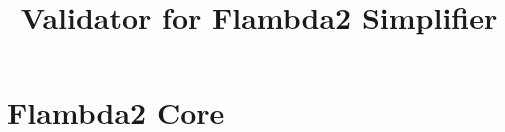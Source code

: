 \documentclass[11pt,fleqn]{amsart}
\begin{document}
\title{Validator for Flambda2 Simplifier}
\date{}
\maketitle{}


\section{Flambda2 Core}

\newcommand{\expr}{\mathit{exp}}
\newcommand{\var}{\mathit{var}}
\newcommand{\named}{\mathit{named}}
\newcommand{\arms}{\mathit{arms}}
\newcommand{\codeid}{\mathit{id}}
\newcommand{\code}{\mathit{code}}
\newcommand{\setofclo}{P}
\newcommand{\block}{\mathit{block}}
\newcommand{\blockpat}{\mathit{b}}
\newcommand{\simple}{\mathit{simple}}
\newcommand{\prim}{\mathit{prim}}
\newcommand{\staticconsts}{\chi}
\newcommand{\recinfo}{\mathsf{rec\_info}}
\newcommand{\idexpr}{\mathit{id\_exp}}
\newcommand{\symb}{\mathit{symbol}}
\newcommand{\const}{\mathit{const}}
\newcommand{\callid}{\kappa}
\newcommand{\direct}{\mathsf{direct}}
\newcommand{\indirect}{\mathsf{indirect}}
\newcommand{\method}{\mathsf{method}}
\newcommand{\ccall}{\mathsf{c\_call}}
\newcommand{\blockconst}[3]{\mathsf{block}(#1,\,#2,\,#3)}

\newcommand{\sep}{\; | \;}
\newcommand{\letexp}[3]{\mathsf{let}\; #1 \; = \; #2 \; \mathsf{in} \; #3}
\newcommand{\letcodeexp}[3]{\mathsf{let}\; (\mathsf{code}^{\uparrow} \; #1) \; = \; #2 \; \mathsf{in} \; #3}
\newcommand{\letcloexp}[3]{\mathsf{let}\; (\mathsf{clo} \; #1) \; = \; #2 \; \mathsf{in} \; #3}
\newcommand{\letstaticcloexp}[3]{\mathsf{let}\; (\mathsf{clo}^{\uparrow} \; #1) \; = \; #2 \; \mathsf{in} \; #3}
\newcommand{\letblockexp}[3]{\mathsf{let}\; (\mathsf{block}^{\uparrow} \; #1) \; = \; #2 \; \mathsf{in} \; #3}
\newcommand{\subst}[3]{#1 \; [ #2 \setminus #3 ]}
\newcommand{\letcont}[4]{#1 \; \mathsf{where} \; #2 \; #3 \; = \; #4}
\newcommand{\step}{\longrightarrow}
\newcommand{\applycont}[2]{#1 \; #2}
\newcommand{\apply}[5]{\mathsf{call}(#1) \; \mathsf{with} \; (#2, \, #3, \, #4, \, #5)}
\newcommand{\abst}[2]{\lambda \; #1.\, #2}
\newcommand{\switch}[2]{\mathsf{switch}\; (#1) \; #2}
\newcommand{\args}[1]{\overrightarrow{#1}}
\newcommand{\substchain}[2]{\; [ #1 \setminus #2 ]}
\newcommand{\invalid}{\mathsf{invalid}}
\newcommand{\load}[3]{\mathsf{load}(#1,\,#2,\,#3)}
\newcommand{\makeblock}[3]{\mathsf{make\_block}(#1,\,#2,\,#3)}
\end{document}
